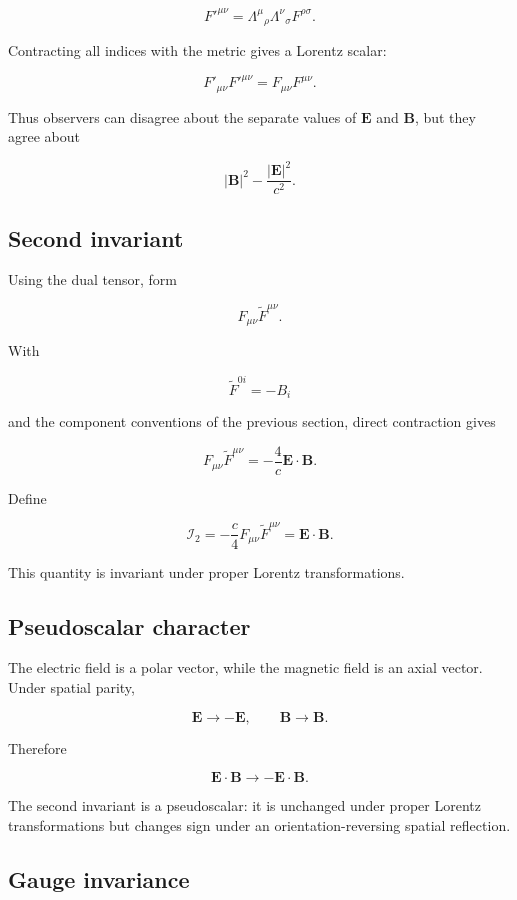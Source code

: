 \[
F'^{\mu\nu}
=
\Lambda^{\mu}{}_{\rho}
\Lambda^{\nu}{}_{\sigma}
F^{\rho\sigma}.
\]

Contracting all indices with the metric gives a Lorentz scalar:

\[
F'_{\mu\nu}F'^{\mu\nu}
=
F_{\mu\nu}F^{\mu\nu}.
\]

Thus observers can disagree about the separate values of \(\mathbf{E}\) and \(\mathbf{B}\), but they agree about

\[
|\mathbf{B}|^2
-
\frac{|\mathbf{E}|^2}{c^2}.
\]

\subsection{Second invariant}

Using the dual tensor, form

\[
F_{\mu\nu}
\widetilde{F}^{\mu\nu}.
\]

With

\[
\widetilde{F}^{0i}=-B_i
\]

and the component conventions of the previous section, direct contraction gives

\[
\boxed{
F_{\mu\nu}
\widetilde{F}^{\mu\nu}
=
-
\frac{4}{c}
\mathbf{E}\cdot\mathbf{B}
}.
\]

Define

\[
\boxed{
\mathcal{I}_2
=
-
\frac{c}{4}
F_{\mu\nu}
\widetilde{F}^{\mu\nu}
=
\mathbf{E}\cdot\mathbf{B}
}.
\]

This quantity is invariant under proper Lorentz transformations.

\subsection{Pseudoscalar character}

The electric field is a polar vector, while the magnetic field is an axial vector. Under spatial parity,

\[
\mathbf{E}
\longrightarrow
-\mathbf{E},
\qquad
\mathbf{B}
\longrightarrow
\mathbf{B}.
\]

Therefore

\[
\mathbf{E}\cdot\mathbf{B}
\longrightarrow
-
\mathbf{E}\cdot\mathbf{B}.
\]

The second invariant is a pseudoscalar: it is unchanged under proper Lorentz transformations but changes sign under an orientation-reversing spatial reflection.

\subsection{Gauge invariance}

